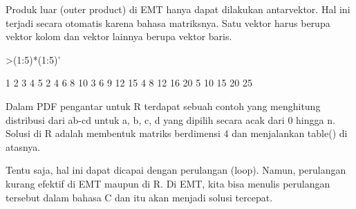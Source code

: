 \documentclass{article}
\newenvironment{eulernotebook}{\par}{\par}
\newenvironment{eulercomment}{\par\medskip}{\par\medskip}
\begin{document}
\begin{eulernotebook}
\begin{eulercomment}
\begin{eulercomment}
\begin{eulercomment}
\begin{eulercomment}
\begin{euleroutput}
\end{euleroutput}
\begin{eulercomment}
Produk luar (outer product) di EMT hanya dapat dilakukan antarvektor.
Hal ini terjadi secara otomatis karena bahasa matriksnya. Satu vektor
harus berupa vektor kolom dan vektor lainnya berupa vektor baris.
\end{eulercomment}
\begin{eulerprompt}
>(1:5)*(1:5)'
\end{eulerprompt}
\begin{euleroutput}
          1         2         3         4         5 
          2         4         6         8        10 
          3         6         9        12        15 
          4         8        12        16        20 
          5        10        15        20        25 
\end{euleroutput}
\begin{eulercomment}
Dalam PDF pengantar untuk R terdapat sebuah contoh yang menghitung
distribusi dari ab-cd untuk a, b, c, d yang dipilih secara acak dari 0
hingga n. Solusi di R adalah membentuk matriks berdimensi 4 dan
menjalankan table() di atasnya.

Tentu saja, hal ini dapat dicapai dengan perulangan (loop). Namun,
perulangan kurang efektif di EMT maupun di R. Di EMT, kita bisa
menulis perulangan tersebut dalam bahasa C dan itu akan menjadi solusi
tercepat.


\end{eulercomment}
\end{eulercomment}
\end{eulercomment}
\end{eulercomment}
\end{eulercomment}
\end{eulernotebook}
\end{document}

